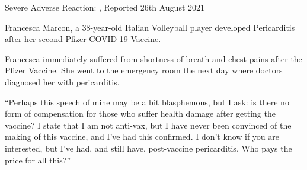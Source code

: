 Severe Adverse Reaction: , Reported 26th August 2021

Francesca Marcon, a 38-year-old Italian Volleyball player developed Pericarditis
after her second Pfizer COVID-19 Vaccine.

Francesca immediately suffered from shortness of breath and chest pains after
the Pfizer Vaccine. She went to the emergency room the next day where doctors
diagnosed her with pericarditis.

“Perhaps this speech of mine may be a bit blasphemous, but I ask: is there no
form of compensation for those who suffer health damage after getting the
vaccine? I state that I am not anti-vax, but I have never been convinced of the
making of this vaccine, and I’ve had this confirmed. I don’t know if you are
interested, but I’ve had, and still have, post-vaccine pericarditis. Who pays
the price for all this?”
